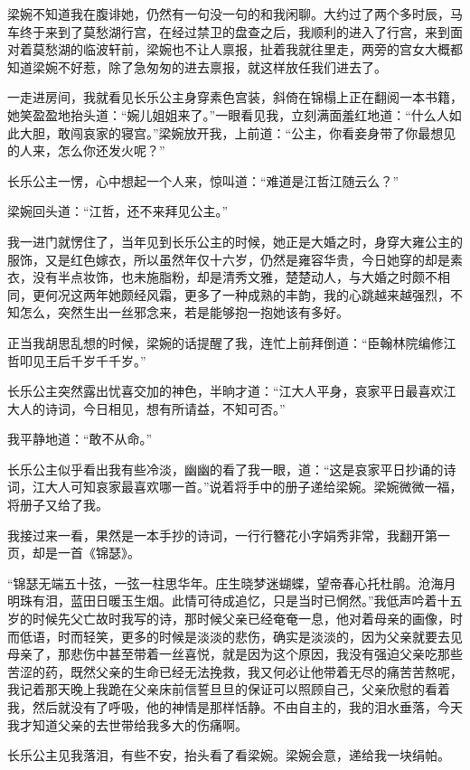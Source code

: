 梁婉不知道我在腹诽她，仍然有一句没一句的和我闲聊。大约过了两个多时辰，马车终于来到了莫愁湖行宫，在经过禁卫的盘查之后，我顺利的进入了行宫，来到面对着莫愁湖的临波轩前，梁婉也不让人禀报，扯着我就往里走，两旁的宫女大概都知道梁婉不好惹，除了急匆匆的进去禀报，就这样放任我们进去了。

一走进房间，我就看见长乐公主身穿素色宫装，斜倚在锦榻上正在翻阅一本书籍，她笑盈盈地抬头道：“婉儿姐姐来了。”一眼看见我，立刻满面羞红地道：“什么人如此大胆，敢闯哀家的寝宫。”梁婉放开我，上前道：“公主，你看妾身带了你最想见的人来，怎么你还发火呢？”

长乐公主一愣，心中想起一个人来，惊叫道：“难道是江哲江随云么？”

梁婉回头道：“江哲，还不来拜见公主。”

我一进门就愣住了，当年见到长乐公主的时候，她正是大婚之时，身穿大雍公主的服饰，又是红色嫁衣，所以虽然年仅十六岁，仍然是雍容华贵，今日她穿的却是素衣，没有半点妆饰，也未施脂粉，却是清秀文雅，楚楚动人，与大婚之时颇不相同，更何况这两年她颇经风霜，更多了一种成熟的丰韵，我的心跳越来越强烈，不知怎么，突然生出一丝邪念来，若是能够抱一抱她该有多好。

正当我胡思乱想的时候，梁婉的话提醒了我，连忙上前拜倒道：“臣翰林院编修江哲叩见王后千岁千千岁。”

长乐公主突然露出忧喜交加的神色，半晌才道：“江大人平身，哀家平日最喜欢江大人的诗词，今日相见，想有所请益，不知可否。”

我平静地道：“敢不从命。”

长乐公主似乎看出我有些冷淡，幽幽的看了我一眼，道：“这是哀家平日抄诵的诗词，江大人可知哀家最喜欢哪一首。”说着将手中的册子递给梁婉。梁婉微微一福，将册子又给了我。

我接过来一看，果然是一本手抄的诗词，一行行簪花小字娟秀非常，我翻开第一页，却是一首《锦瑟》。

“锦瑟无端五十弦，一弦一柱思华年。庄生晓梦迷蝴蝶，望帝春心托杜鹃。沧海月明珠有泪，蓝田日暖玉生烟。此情可待成追忆，只是当时已惘然。”我低声吟着十五岁的时候先父亡故时我写的诗，那时候父亲已经奄奄一息，他对着母亲的画像，时而低语，时而轻笑，更多的时候是淡淡的悲伤，确实是淡淡的，因为父亲就要去见母亲了，那悲伤中甚至带着一丝喜悦，就是因为这个原因，我没有强迫父亲吃那些苦涩的药，既然父亲的生命已经无法挽救，我又何必让他带着无尽的痛苦苦熬呢，我记着那天晚上我跪在父亲床前信誓旦旦的保证可以照顾自己，父亲欣慰的看着我，然后就没有了呼吸，他的神情是那样恬静。不由自主的，我的泪水垂落，今天我才知道父亲的去世带给我多大的伤痛啊。

长乐公主见我落泪，有些不安，抬头看了看梁婉。梁婉会意，递给我一块绢帕。

